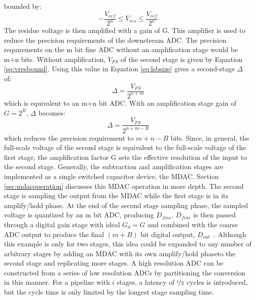 bounded by:
\begin{equation}
\label{eq:vresbound}
-\frac{V_{ref}}{2^{n}} \leq V_{res} \leq \frac{V_{ref}}{2^{n}}
\end{equation}
The residue voltage is then amplified with a gain of G. This amplifier is used to reduce the precision requirements of the downstream ADC. The precision requirements on the  m bit fine ADC without an amplification stage would be m+n bits. Without amplification, $V_{FS}$ of the second stage is given by Equation \ref{eq:vresbound}. Using this value in Equation \ref{eq:lsbsize} gives a second-stage $\Delta$ of: 
\begin{equation}
\Delta=\frac{V_{FS}}{2^{n+m}}
\end{equation}
which is equivalent to an m+n bit ADC.  With an amplification stage gain of $G=2^B$, $\Delta$ becomes:
\begin{equation}
\Delta=\frac{V_{FS}}{2^{n+m-B}}
\end{equation}
which reduces the precision requirement to $m+n-B$ bits. Since, in general, the full-scale voltage of the second stage is equivalent to the full-scale voltage of the first stage, the amplification factor G sets the 
effective resolution of the input to the second stage. Generally, the subtraction and amplification stages are implemented as a single switched capacitor device, the MDAC. Section \ref{sec:mdacoperation} discusses this MDAC 
operation in more depth. The second stage is sampling the output from the MDAC while the first stage is in its amplify/hold phase. At the end of the second stage sampling phase, the sampled voltage is quantized by an m bit 
ADC, producing $D_{fine}$. $D_{fine}$ is then passed through a digital gain stage with ideal $G_d=G$  and combined with the coarse ADC output to produce the final $(m+B)$ bit digital output, $D_{out}$~\cite{advanalogch8}. 
Although this example is only for two stages, this idea could be expanded to any number of arbitrary stages by adding an MDAC with its own amplify/hold phaseto the second stage and replicating more stages. A high resolution ADC can be constructed from a series of low resolution ADCs by partitioning the conversion in this manner. For a pipeline with $i$ stages, a latency of $\nicefrac{i}{2}$ cycles is introduced, but the cycle time is only limited by the longest stage sampling time. 
